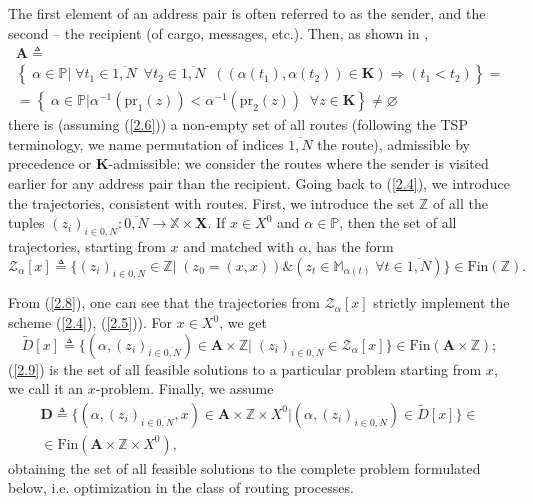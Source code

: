 \documentclass[numbers,sort&compress]{IntechOpen-Book}%
\begin{document}
The first element of an address pair
is often referred to as the sender,
and the second -- the recipient
(of cargo, messages, etc.).
Then, as shown in \cite[part 2]{14},
\begin{multline}\label{2.7}
    \mathbf{A} {\triangleq} \\
    \left\{\;\alpha \in \mathbb{P} \vert\;
      \forall{t_1} \in \overline{1,N}\;\
      \forall{t_2}  \in \overline{1,N}\;\;
      ((\alpha(t_1),\alpha(t_2)) \in \mathbf{K})
      \Longrightarrow (t_1 < t_2)
    \right\} = \\
    =
    \left\{\;
      \alpha \in \mathbb{P} \vert
      \alpha^{-1}(\mathrm{pr}_1(z)) < \alpha^{-1}(\mathrm{pr}_2(z))\;\;\forall{z}
      \in \mathbf{K}
    \right\} \ne \varnothing
\end{multline}
there is
(assuming (\ref{2.6}))
a non-empty set of all routes
(following the TSP terminology,
we name permutation of indices $\overline {1, N}$
the route),
admissible by precedence or $\mathbf {K}$-admissible:
we consider the routes
where the sender is visited earlier for any address pair
than the recipient.
Going back to (\ref{2.4}),
we introduce the trajectories,
consistent with routes.
First, we introduce the set
$\mathbb{Z}$
of all the tuples
$(z_i)_{i \in \overline{0,N}}: \overline{0,N} \longrightarrow \mathbb{X} \times \mathbf{X}$.
If $x \in X^0$ and $\alpha \in \mathbb{P}$,
then
the set of all trajectories,
starting from $ x $
and matched with $\alpha $,
has the form
\begin{equation}\label{2.8}
\mathcal{Z}_\alpha[x] {\triangleq} \{(z_i)_{i \in \overline{0,N}}
\in \mathbb{Z} \vert\;(z_0 = (x,x)) \& (z_t \in \mathbb{M}_{\alpha(t)}\;\forall{t} \in \overline{1,N})\} \in \mathrm{Fin}(\mathbb{Z}).
\end{equation}

From (\ref{2.8}),
one can see
that the trajectories from
$ \mathcal {Z}_\alpha[x] $
strictly implement the scheme
 (\ref{2.4}), (\ref{2.5})).
For $x \in X^0$,
we get
\begin{equation}\label{2.9}
  \tilde{D}[x] {\triangleq}
  \{(\alpha,(z_i)_{i \in \overline{0,N}}) \in \mathbf{A} \times \mathbb{Z}
  \vert \;(z_i)_{i \in \overline{0,N}} \in \mathcal{Z}_\alpha[x]\}
  \in \mathrm{Fin}(\mathbf{A} \times \mathbb{Z});
\end{equation}
 (\ref{2.9})
is the set of all feasible solutions
to a particular problem starting from $x$,
we call it an $x$-problem.
Finally, we assume
\begin{multline}\label{2.10}
  \mathbf{D} {\triangleq}
  \{(\alpha,(z_i)_{i \in \overline{0,N}},x) \in \mathbf{A} \times \mathbb{Z} \times X^0 \vert
  (\alpha,(z_i)_{i \in \overline{0,N}}) \in \tilde{D}[x]\}
  \in
  \\
  \in \mathrm{Fin}(\mathbf{A} \times \mathbb{Z} \times X^0),
\end{multline}
obtaining the set of all
feasible solutions to the complete problem formulated below,
i.e. optimization in the class of routing processes.
\end{document}
